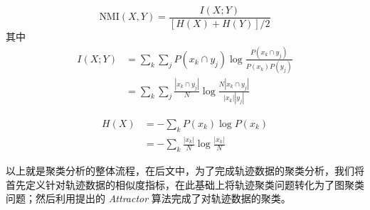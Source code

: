  \begin{equation}
\mbox{NMI}(X , Y)
= 
\frac{
I(X ; Y)
}
{
[H(X)+ H(Y)]/2
}
\end{equation}
其中
\begin{equation*}
\begin{split}
I( X ; Y )
&=
\sum_k \sum_j     P(x_k \cap y_j) \log
\frac{P(x_k \cap y_j)}{P(x_k)P(y_j)}\\
&=
\sum_k \sum_j     \frac{|x_k \cap y_j|}{N} \log
\frac{N|x_k \cap y_j|}{|x_k||y_j|}
\end{split}
\end{equation*}

\begin{equation*}
\begin{split}
H(X) &= -\sum_k P(x_k) \log P(x_k)\\
&= -\sum_k \frac{|x_k|}{N} \log \frac{|x_k|}{N}
\end{split}
\end{equation*}


\vspace{2mm}
以上就是聚类分析的整体流程，在后文中，为了完成轨迹数据的聚类分析，我们将首先定义针对轨迹数据的相似度指标，在此基础上将轨迹聚类问题转化为了图聚类问题；然后利用提出的 \emph{Attractor} 算法完成了对轨迹数据的聚类。



